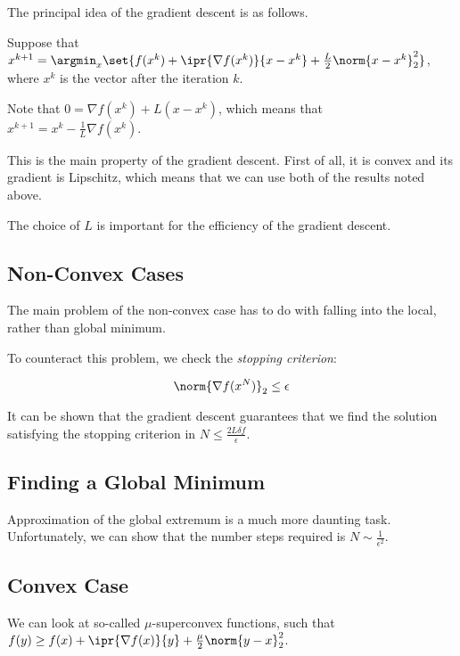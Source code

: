 \documentclass[11pt]{scrartcl}
\begin{document}
  The principal idea of the gradient descent is as follows.

  Suppose that
  $x^{k+1} = \argmin_{x}\set{f(x^{k}) + \ipr{\nabla f(x^{k})}{x-x^{k}}
    + \frac{L}{2}\norm{x-x^{k}}_{2}^{2}} $, where $x^{k}$ is the
  vector after the iteration $k$.

  Note that $0 = \nabla f(x^{k}) + L(x-x^{k})$, which means that
  $x^{k+1} = x^{k} - \frac{1}{L}\nabla f(x^{k})$.

  This is the main property of the gradient descent. First of all, it
  is convex and its gradient is Lipschitz, which means that we can use
  both of the results noted above.

  The choice of $L$ is important for the efficiency of the gradient
  descent.

  \subsection{Non-Convex Cases}

  The main problem of the non-convex case has to do with falling into
  the local, rather than global minimum.

  To counteract this problem, we check the \textit{stopping criterion}:

  
  \begin{equation*}
    \norm{\nabla f(x^{N})}_{2 }\leq \epsilon
  \end{equation*}


  It can be shown that the gradient descent guarantees that we find
  the solution satisfying the stopping criterion in
  $N \leq \frac{2L \delta f}{\epsilon}$.

  \subsection{Finding a Global Minimum}

  Approximation of the global extremum is a much more daunting task.
  Unfortunately, we can show that the number steps required is
  $N\sim \frac{1}{\epsilon^{2}}$.

  \subsection{Convex Case}

  We can look at so-called $\mu$-superconvex functions, such that
  $f(y) \geq f(x) + \ipr{\nabla f(x)}{y} + \frac{\mu}{2}
  \norm{y-x}^{2}_{2}$.
\end{document}
